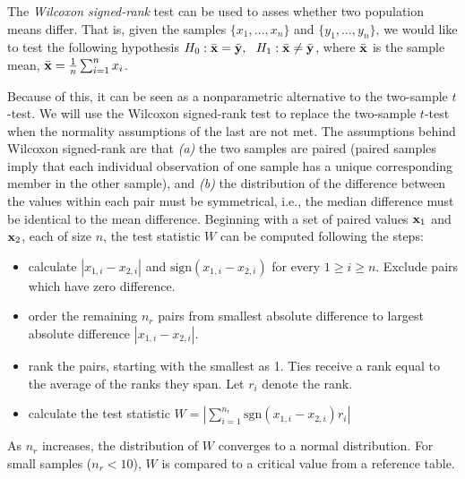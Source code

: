 The \emph{Wilcoxon signed-rank} test can be used to asses whether two population means differ. That is, given the samples $\{x_1, \ldots, x_n\}$ and $\{y_1, \ldots, y_n\}$, we would like to test the following hypothesis $H_0: \bar{\mathbf{x}} = \bar{\mathbf{y}}, ~~ H_1: \bar{\mathbf{x}} \neq \bar{\mathbf{y}}$, where $\bar{\mathbf{x}}$ is the sample mean, $\bar{\mathbf{x}} = \frac{1}{n}\sum_{i=1}^n x_i$.


Because of this, it can be seen as a nonparametric alternative to the two-sample $t$-test. We will use the Wilcoxon signed-rank test to replace the two-sample $t$-test when the normality assumptions of the last are not met. The assumptions behind Wilcoxon signed-rank are that \emph{(a)} the two samples are paired (paired samples imply that each individual observation of one sample has a unique corresponding member in the other sample), and \emph{(b)} the distribution of the difference between the values within each pair must be symmetrical, i.e., the median difference must be identical to the mean difference. Beginning with a set of paired values $\mathbf{x}_1$ and $\mathbf{x}_2$, each of size $n$, the test statistic $W$ can be computed following the steps:
\begin{itemize}
\item calculate $|{x}_{1, i} - {x}_{2, i}|$ and $\text{sign}({x}_{1, i} - {x}_{2, i})$ for every $1 \geq i \geq n$. Exclude pairs which have zero difference.
\item order the remaining $n_r$ pairs from smallest absolute difference to largest absolute difference $|{x}_{1, i} - {x}_{2, i}|$.
\item rank the pairs, starting with the smallest as 1. Ties receive a rank equal to the average of the ranks they span. Let $r_i$ denote the rank.
\item calculate the test statistic $W = |\sum_{i=1}^{n_r} \text{sgn}({x}_{1, i} - {x}_{2, i}) r_i|$
\end{itemize}

As $n_r$ increases, the distribution of $W$ converges to a normal distribution. For small samples ($n_r < 10$), $W$ is compared to a critical value from a reference table.

%


